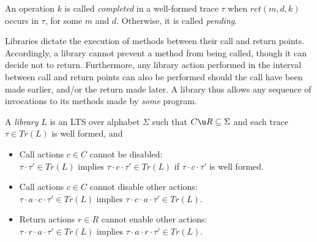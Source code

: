 An operation $k$ is called \emph{completed} in a well-formed trace $\tau$ when
$ret(m,d,k)$ occurs in $\tau$, for some $m$ and $d$. Otherwise, it is called \emph{pending}.

%
%
%

Libraries dictate the execution of methods between their call and return
points. Accordingly, a library cannot prevent a method from being called,
though it can decide not to return. Furthermore, any library action performed
in the interval between call and return points can also be performed should the
call have been made earlier, and/or the return made later. 
A library thus allows any sequence of
invocations to its methods made by \emph{some} program.

\begin{definition}\label{def:libraries}
A \emph{library} $L$ is an LTS over alphabet $\Sigma$ such that $C \u R\subseteq \Sigma$
and each trace $\tau \in Tr(L)$ is well formed, and
  \begin{itemize}

    \item Call actions $c \in C$ cannot be disabled: \\
    $\tau \cdot \tau' \in Tr(L)$ implies $\tau \cdot c \cdot \tau' \in Tr(L)$
    if $\tau \cdot c \cdot \tau'$ is well formed.
  
    \item Call actions $c \in C$ cannot disable other actions: \\
    $\tau \cdot a \cdot c \cdot \tau' \in Tr(L)$ implies $\tau \cdot c \cdot a \cdot \tau' \in Tr(L)$.
  
    \item Return actions $r \in R$ cannot enable other actions: \\
    $\tau \cdot r \cdot a \cdot \tau' \in Tr(L)$ implies $\tau \cdot a \cdot r \cdot \tau' \in Tr(L)$.
  
  \end{itemize}

\end{definition}

